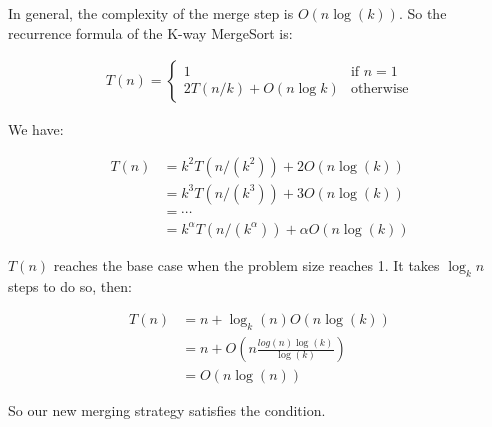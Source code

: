 In general, the complexity of the merge step is $O(n\log(k))$. So the recurrence formula of the K-way MergeSort is:

\begin{align*}
	T(n) = \begin{cases}
	    1& \text{if } n = 1\\
        2T(n/k)+O(n\log{k})              & \text{otherwise}
	\end{cases}
\end{align*}

We have:

\begin{align*}
    T(n) &= k^2 T(n/(k^2)) + 2O(n\log(k)) \\
    &= k^3 T(n/(k^3)) + 3O(n\log(k)) \\
    &= \cdots \\
    &= k^\alpha T(n/(k^\alpha)) + \alpha O(n\log(k))
\end{align*}

$T(n)$ reaches the base case when the problem size reaches 1. It takes $\log_k n$ steps to do so, then:

\begin{align*}
T(n) &= n + \log_k(n) O(n\log(k)) \\
        &= n + O(n\frac{log(n)\log(k)}{\log(k)}) \\
        &= O(n\log(n))
\end{align*}

So our new merging strategy satisfies the condition.

